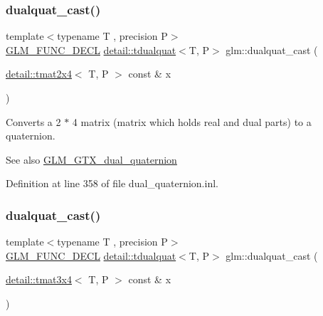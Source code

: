\subsubsection{\texorpdfstring{dualquat\+\_\+cast()}{dualquat\_cast()}\hspace{0.1cm}{\footnotesize\ttfamily [1/2]}}
{\footnotesize\ttfamily template$<$typename T , precision P$>$ \\
\hyperlink{setup_8hpp_ab2d052de21a70539923e9bcbf6e83a51}{G\+L\+M\+\_\+\+F\+U\+N\+C\+\_\+\+D\+E\+CL} \hyperlink{structglm_1_1detail_1_1tdualquat}{detail\+::tdualquat}$<$T, P$>$ glm\+::dualquat\+\_\+cast (\begin{DoxyParamCaption}\item[{\hyperlink{structglm_1_1detail_1_1tmat2x4}{detail\+::tmat2x4}$<$ T, P $>$ const \&}]{x }\end{DoxyParamCaption})}

Converts a 2 $\ast$ 4 matrix (matrix which holds real and dual parts) to a quaternion.

\begin{DoxySeeAlso}{See also}
\hyperlink{group__gtc__dual__quaternion}{G\+L\+M\+\_\+\+G\+T\+X\+\_\+dual\+\_\+quaternion} 
\end{DoxySeeAlso}


Definition at line 358 of file dual\+\_\+quaternion.\+inl.

\mbox{\label{group__gtc__dual__quaternion_ga97c4fb8941ad1954e01578cca8182180}} 
\subsubsection{\texorpdfstring{dualquat\+\_\+cast()}{dualquat\_cast()}\hspace{0.1cm}{\footnotesize\ttfamily [2/2]}}
{\footnotesize\ttfamily template$<$typename T , precision P$>$ \\
\hyperlink{setup_8hpp_ab2d052de21a70539923e9bcbf6e83a51}{G\+L\+M\+\_\+\+F\+U\+N\+C\+\_\+\+D\+E\+CL} \hyperlink{structglm_1_1detail_1_1tdualquat}{detail\+::tdualquat}$<$T, P$>$ glm\+::dualquat\+\_\+cast (\begin{DoxyParamCaption}\item[{\hyperlink{structglm_1_1detail_1_1tmat3x4}{detail\+::tmat3x4}$<$ T, P $>$ const \&}]{x }\end{DoxyParamCaption})}

